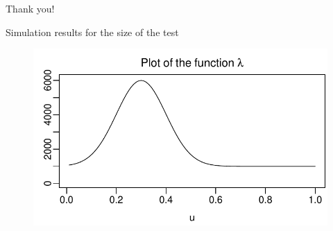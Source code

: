 \documentclass[10pt]{beamer}
\begin{document}
\begin{frame}[standout]
  Thank you!
\end{frame}


\appendix

\begin{frame}{Simulation results for the size of the test}
\begin{figure}[t!]
	\includegraphics[height = 0.4\textheight]{plots/lambda_fct}
\end{figure}
\vspace{-2mm}
\scriptsize{\begin{table}[t]
\begin{center}
\caption{Size of the multiscale test}
\label{tab:size_shape}

\end{center}
\end{table}}
\end{frame}
\end{document}
